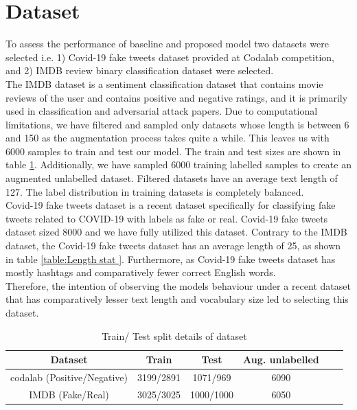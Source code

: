 \documentclass[%
	BCOR=8mm, %
	DIV=12,
	toc=bibliography, %
	toc=listof, %
	oneside, %
	egregdoesnotlikesansseriftitles, %
	]{scrbook}
\begin{document}
\section{Dataset}
\label{label:dataset}
To assess the performance of baseline and proposed model two datasets were selected i.e. 1) Covid-19  fake tweets dataset \cite{patwa_fighting_2021} provided at Codalab competition, and 2) IMDB review binary classification dataset were selected. \\
The IMDB dataset is a sentiment classification dataset \cite{maas_learning_2011-1} that contains movie reviews of the user and contains positive and negative ratings, and it is primarily used in classification and adversarial attack papers. Due to computational limitations, we have filtered and sampled only datasets whose length is between 6 and 150 as the augmentation process takes quite a while. This leaves us with 6000 samples to train and test our model. The train and test sizes are shown in table \ref{table:train/testtable}. Additionally, we have sampled 6000 training labelled samples to create an augmented unlabelled dataset. Filtered datasets have an average text length of 127. The label distribution in training datasets is completely balanced.\\
Covid-19 fake tweets dataset is a recent dataset specifically for classifying fake tweets related to COVID-19 with labels as fake or real. Covid-19 fake tweets dataset sized 8000 and we have fully utilized this dataset. Contrary to the IMDB dataset, the Covid-19  fake tweets dataset has an average length of 25, as shown in table \ref{table:Length stat }. Furthermore, as Covid-19  fake tweets dataset has mostly hashtags and comparatively fewer correct English words.\\
Therefore, the intention of observing the models behaviour under a recent dataset that has comparatively lesser text length and vocabulary size led to selecting this dataset.

\begin{table}[!h]
\centering
\begin{tabular}{ |c|c|c|c|c|c| }
\hline
Dataset & Train & Test  & Aug. unlabelled \\
\hline
codalab (Positive/Negative) & 3199/2891 & 1071/969 & 6090 \\
\hline
IMDB (Fake/Real) & 3025/3025 & 1000/1000 & 6050  \\
\hline
\end{tabular}
\caption[Train/Test/Unlabelled details of dataset]{Train/ Test split details of dataset }
\label{table:train/testtable}
\end{table}
\end{document}
